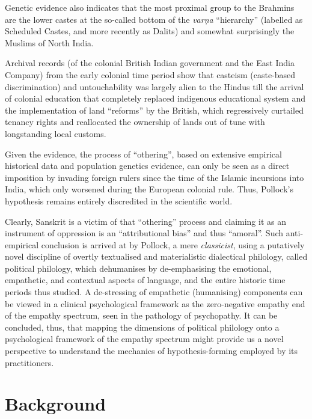 Genetic evidence also indicates that the most proximal group to the Brahmins are the lower castes at the so-called bottom of the \textit{varṇa} “hierarchy” (labelled as Scheduled Castes, and more recently as Dalits) and somewhat surprisingly the Muslims of North India.

Archival records (of the colonial British Indian government and the East India Company) from the early colonial time period show that casteism (caste-based discrimination) and untouchability was largely alien to the Hindus till the arrival of colonial education that completely replaced indigenous educational system and the implementation of land “reforms” by the British, which regressively curtailed tenancy rights and reallocated the ownership of lands out of tune with longstanding local customs.

Given the evidence, the process of “othering”, based on extensive empirical historical data and population genetics evidence, can only be seen as a direct imposition by invading foreign rulers since the time of the Islamic incursions into India, which only worsened during the European colonial rule. Thus, Pollock’s hypothesis remains entirely discredited in the scientific world.

Clearly, Sanskrit is a victim of that “othering” process and claiming it as an instrument of oppression is an “attributional bias” and thus “amoral”. Such anti-empirical conclusion is arrived at by Pollock, a mere \textit{classicist}, using a putatively novel discipline of overtly textualised and materialistic dialectical philology, called political philology, which dehumanises by de-emphasising the emotional, empathetic, and contextual aspects of language, and the entire historic time periods thus studied. A de-stressing of empathetic (humanising) components can be viewed in a clinical psychological framework as the zero-negative empathy end of the empathy spectrum, seen in the pathology of psychopathy. It can be concluded, thus, that mapping the dimensions of political philology onto a psychological framework of the empathy spectrum might provide us a novel perspective to understand the mechanics of hypothesis-forming employed by its practitioners.

\vspace{-.3cm}

\section*{Background}

